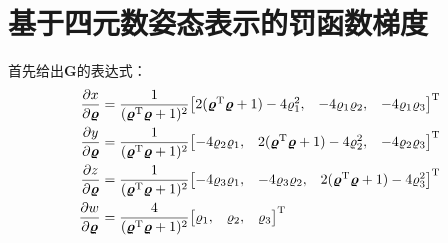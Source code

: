 
\chapter{基于四元数姿态表示的罚函数梯度}\label{appdx:C}
\newcommand{\den}{(\trans{\bm{\varrho}}\bm{\varrho} + 1)^3}
\newcommand{\numone}{(3\varrho_1^2-\varrho_2^2-\varrho_3^2-1)}
\newcommand{\nummone}{(\varrho_1^2-3\varrho_2^2-3\varrho_3^2-2)}
\newcommand{\numtwo}{(3\varrho_2^2-\varrho_1^2-\varrho_3^2-1)}
\newcommand{\nummtwo}{(\varrho_2^2-3\varrho_1^2-3\varrho_3^2-2)}
\newcommand{\numthr}{(3\varrho_3^2-\varrho_1^2-\varrho_2^2-1)}
\newcommand{\nummthr}{(\varrho_3^2-3\varrho_1^2-3\varrho_2^2-2)}
\newcommand{\hhh}{16\varrho_1\varrho_2\varrho_3}
\newcommand{\rk}[1]{\varrho_{#1}}
\newcommand{\hes}[3]{\frac{\partial^2 #1}{\partial #2 \partial #3}}
\newcommand{\hess}[2]{\frac{\partial^2 #1}{\partial {#2}^2}}

首先给出$\bm{G}$的表达式： 
\begin{align}
    \frac{\partial{x}}{\partial{\bm{\varrho}}} &= \frac{1}{({\bm{\varrho}}^{\text{T}}\bm{\varrho} + 1)^2}
    {\begin{bmatrix}
        2({\bm{\varrho}}^{\text{T}}\bm{\varrho} + 1)-4\varrho_1^2, & 
        -4\varrho_1\varrho_2, & 
        -4\varrho_1\varrho_3
    \end{bmatrix}}^{\text{T}} \\
    \frac{\partial{y}}{\partial{\bm{\varrho}}} &= \frac{1}{({\bm{\varrho}}^{\text{T}}\bm{\varrho} + 1)^2}
    {\begin{bmatrix}
        -4\varrho_2\varrho_1, & 
        2({\bm{\varrho}}^{\text{T}}\bm{\varrho} + 1)-4\varrho_2^2, & 
        -4\varrho_2\varrho_3
    \end{bmatrix}}^{\text{T}} \\    
    \frac{\partial{z}}{\partial{\bm{\varrho}}} &= \frac{1}{({\bm{\varrho}}^{\text{T}}\bm{\varrho} + 1)^2}
    {\begin{bmatrix}
        -4\varrho_3\varrho_1, & 
        -4\varrho_3\varrho_2, & 
        2({\bm{\varrho}}^{\text{T}}\bm{\varrho} + 1)-4\varrho_3^2
    \end{bmatrix}}^{\text{T}} \\    
    \frac{\partial{w}}{\partial{\bm{\varrho}}} &= \frac{4}{({\bm{\varrho}}^{\text{T}}\bm{\varrho} + 1)^2}
    {\begin{bmatrix}
        \varrho_1, & \varrho_2, & \varrho_3
    \end{bmatrix}}^{\text{T}}
\end{align}

